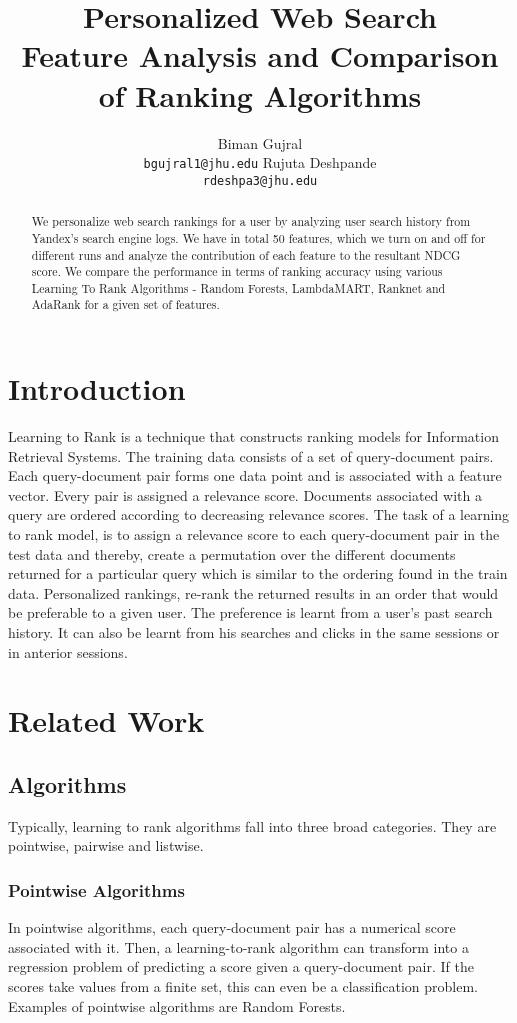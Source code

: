 \documentclass[11pt,letterpaper]{article}
\title{Personalized Web Search\\ Feature Analysis and Comparison of Ranking Algorithms}
\author{Biman Gujral\\
  {\tt bgujral1@jhu.edu}
  \And
  Rujuta Deshpande \\
  {\tt rdeshpa3@jhu.edu}}
\date{}
\begin{document}
\maketitle
\begin{abstract}
 We personalize web search rankings for a user by analyzing user search history from Yandex's search engine logs. We have in total 50 features, which we turn on and off for different runs and analyze the contribution of each feature to the resultant NDCG score. We compare the performance in terms of ranking accuracy using various Learning To Rank Algorithms - Random Forests, LambdaMART, Ranknet and AdaRank for a given set of features. 
\end{abstract}

\section{Introduction}
Learning to Rank is a technique that constructs ranking models for Information Retrieval Systems. The training data consists of a set of query-document pairs. Each query-document pair forms one data point and is associated with a feature vector. Every pair is assigned a relevance score. Documents associated with a query are ordered according to decreasing relevance scores. The task of a learning to rank model, is to assign a relevance score to each query-document pair in the test data and thereby, create a permutation over the different documents returned for a particular query which is similar to the ordering found in the train data. Personalized rankings, re-rank the returned results in an order that would be preferable to a given user. The preference is learnt from a user's past search history. It can also be learnt from his searches and clicks in the same sessions or in anterior sessions.
\section{Related Work}

\subsection{Algorithms}
Typically, learning to rank algorithms fall into three broad categories. They are pointwise, pairwise and listwise. 
\subsubsection{Pointwise Algorithms}
In pointwise algorithms, each query-document pair has a numerical score associated with it. Then, a learning-to-rank algorithm can transform into a regression problem of predicting a score given a query-document pair. If the scores take values from a finite set, this can even be a classification problem. Examples of pointwise algorithms are Random Forests. 
\end{document}
